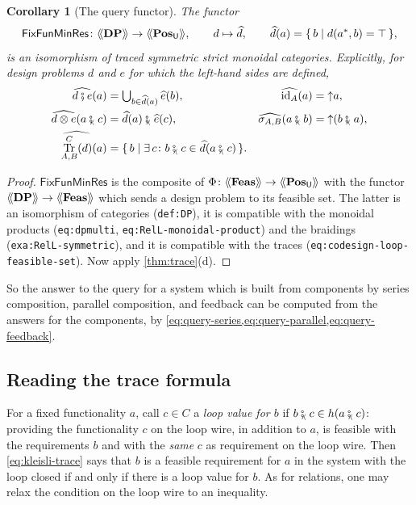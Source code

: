 \documentclass[11pt,a4paper]{article}
\theoremstyle{plain}
\newtheorem{corollary}[theorem]{Corollary}
\theoremstyle{definition}
\theoremstyle{remark}
\newcommand{\Cat}[1]{\mathbf{#1}}
\newcommand{\Pos}{\Cat{Pos}}
\newcommand{\Feas}{\Cat{Feas}}
\newcommand{\DP}{\Cat{DP}}
\newcommand{\U}{\mathsf{U}}
\newcommand{\PosU}{\Pos_{\U}}
\providecommand{\llangle}{\mathopen{\langle\mkern-3.5mu\langle}}
\providecommand{\rrangle}{\mathclose{\rangle\mkern-3.5mu\rangle}}
\newcommand{\tL}[1]{\llangle #1 \rrangle}
\newcommand{\then}{\mathbin{\fatsemi}}
\newcommand{\tc}{\mathbin{\fatsemi_{\!\scriptscriptstyle\langle}}}
\newcommand{\up}{\mathord{\uparrow}}
\DeclareMathOperator{\Tr}{Tr}
\newcommand{\id}{\mathrm{id}}
\newcommand{\Fix}{\mathsf{FixFunMinRes}}
\newcommand{\lbl}[1]{\nolinkurl{#1}}
\begin{document}
\begin{corollary}[The query functor]
    \label{cor:fixfunminres}
    The functor
    \begin{equation*}
        \Fix \colon \tL{\DP} \to \tL{\PosU},
        \qquad
        d \mapsto \widehat{d},
        \qquad
        \widehat{d}(a) = \{\, b \mid d(a^*, b) = \top \,\},
    \end{equation*}
    is an isomorphism of traced symmetric strict monoidal categories.
    Explicitly, for design problems $d$ and $e$ for which the left-hand sides are defined,
    \begin{align}
        \label{eq:query-series}
        \widehat{d \then e}(a) & = \textstyle\bigcup_{b \in \widehat{d}(a)} \widehat{e}(b), &
        \widehat{\id_A}(a) & = \up a, \\
        \label{eq:query-parallel}
        \widehat{d \otimes e}(a \tc c) & = \widehat{d}(a) \tc \widehat{e}(c), &
        \widehat{\sigma_{A,B}}(a \tc b) & = \up (b \tc a), \\
        \label{eq:query-feedback}
        \widehat{\Tr^{C}_{A,B}(d)}(a) & = \{\, b \mid \exists\, c \colon b \tc c \in \widehat{d}(a \tc c) \,\}.
    \end{align}
\end{corollary}
\begin{proof}
    $\Fix$ is the composite of $\Phi \colon \tL{\Feas} \to \tL{\PosU}$ with the functor $\tL{\DP} \to \tL{\Feas}$ which sends a design problem to its feasible set.
    The latter is an isomorphism of categories (\lbl{def:DP}), it is compatible with the monoidal products (\lbl{eq:dpmulti}, \lbl{eq:RelL-monoidal-product}) and the braidings (\lbl{exa:RelL-symmetric}), and it is compatible with the traces (\lbl{eq:codesign-loop-feasible-set}).
    Now apply \cref{thm:trace}(d).
\end{proof}

So the answer to the query for a system which is built from components by series composition, parallel composition, and feedback can be computed from the answers for the components, by \cref{eq:query-series,eq:query-parallel,eq:query-feedback}.

\subsection{Reading the trace formula}

For a fixed functionality $a$, call $c \in C$ a \emph{loop value for $b$} if $b \tc c \in h(a \tc c)$: providing the functionality $c$ on the loop wire, in addition to $a$, is feasible with the requirements $b$ and with the \emph{same} $c$ as requirement on the loop wire.
Then \cref{eq:kleisli-trace} says that $b$ is a feasible requirement for $a$ in the system with the loop closed if and only if there is a loop value for $b$.
As for relations, one may relax the condition on the loop wire to an inequality.
\end{document}
